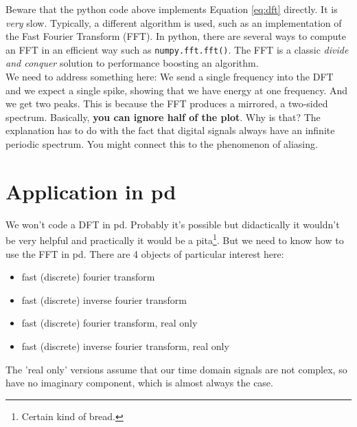 
Beware that the python code above implements Equation \ref{eq:dft} directly. It is \textit{very} slow. Typically, a different algorithm is used, such as an implementation of the Fast Fourier Transform (FFT). In python, there are several ways to compute an FFT in an efficient way such as \texttt{numpy.fft.fft()}. The FFT is a classic \textit{divide and conquer} solution to performance boosting an algorithm.\\
We need to address something here: We send a single frequency into the DFT and we expect a single spike, showing that we have energy at one frequency. And we get two peaks. This is because the FFT produces a mirrored, a two-sided spectrum. Basically, \textbf{you can ignore half of the plot}. Why is that? The explanation has to do with the fact that digital signals always have an infinite periodic spectrum. You might connect this to the phenomenon of aliasing.

\section{Application in pd}
We won't code a DFT in pd. Probably it's possible but didactically it wouldn't be very helpful and practically it would be a pita\footnote{Certain kind of bread.}. But we need to know how to use the FFT in pd. There are 4 objects of particular interest here:
\begin{itemize}
	\item {} fast (discrete) fourier transform
	\item {} fast (discrete) inverse fourier transform
	\item {} fast (discrete) fourier transform, real only
	\item {} fast (discrete) inverse fourier transform, real only
\end{itemize}
The 'real only' versions assume that our time domain signals are not complex, so have no imaginary component, which is almost always the case.
